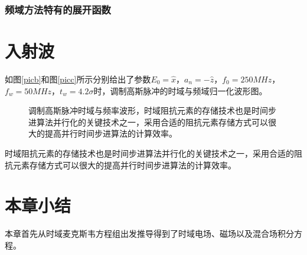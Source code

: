 \subsubsection{频域方法特有的展开函数}

\section{入射波}

如图\ref{picb}和图\ref{picc}所示分别给出了参数$E_0=\hat{x}$，$a_n=-\hat{z}$，$f_0=250MHz$，$f_w=50MHz$，$t_w=4.2\sigma$时，调制高斯脉冲的时域与频域归一化波形图。

\begin{figure}[h]
\caption{调制高斯脉冲时域与频率波形，时域阻抗元素的存储技术也是时间步进算法并行化的关键技术之一，采用合适的阻抗元素存储方式可以很大的提高并行时间步进算法的计算效率。}
\label{fig1}
\end{figure}

时域阻抗元素的存储技术也是时间步进算法并行化的关键技术之一，采用合适的阻抗元素存储方式可以很大的提高并行时间步进算法的计算效率。

\section{本章小结}
本章首先从时域麦克斯韦方程组出发推导得到了时域电场、磁场以及混合场积分方程。
